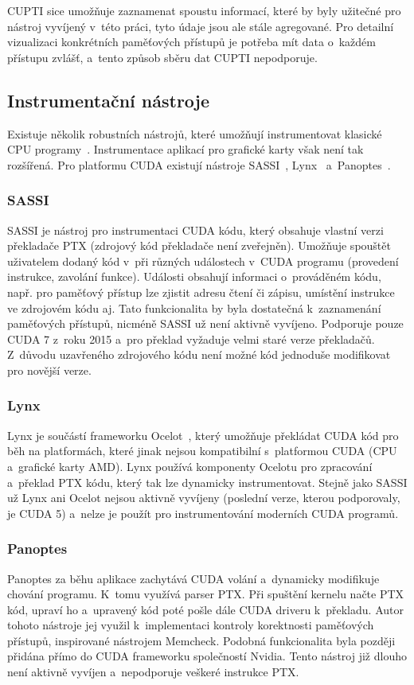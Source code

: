 CUPTI sice umožňuje zaznamenat spoustu informací, které by byly užitečné pro nástroj vyvíjený v~této práci, tyto údaje jsou ale stále agregované. Pro detailní vizualizaci konkrétních paměťových přístupů je potřeba mít data o~každém přístupu zvlášť, a~tento způsob sběru dat CUPTI nepodporuje.

\subsection{Instrumentační nástroje}
Existuje několik robustních nástrojů, které umožňují instrumentovat klasické CPU programy~\cite{valgrind, pin, dynamorio}. Instrumentace aplikací pro grafické karty však není tak rozšířená. Pro platformu CUDA existují nástroje SASSI~\cite{sassi}, Lynx~\cite{lynx} a~Panoptes~\cite{panoptes}.

\subsubsection*{SASSI}
SASSI je nástroj pro instrumentaci CUDA kódu, který obsahuje vlastní verzi překladače PTX (zdrojový kód překladače není zveřejněn). Umožňuje spouštět uživatelem dodaný kód v~\CPP\hspace{1mm}při různých událostech v~CUDA programu (provedení instrukce, zavolání funkce). Události obsahují informaci o~prováděném kódu, např. pro paměťový přístup lze zjistit adresu čtení či zápisu, umístění instrukce ve zdrojovém kódu aj. Tato funkcionalita by byla dostatečná k~zaznamenání paměťových přístupů, nicméně SASSI už není aktivně vyvíjeno. Podporuje pouze CUDA 7 z~roku 2015 a~pro překlad vyžaduje velmi staré verze překladačů. Z~důvodu uzavřeného zdrojového kódu není možné kód jednoduše modifikovat pro novější verze.

\subsubsection*{Lynx}
Lynx je součástí frameworku Ocelot~\cite{ocelot}, který umožňuje překládat CUDA kód pro běh na platformách, které jinak nejsou kompatibilní s~platformou CUDA (CPU a~grafické karty AMD). Lynx používá komponenty Ocelotu pro zpracování a~překlad PTX kódu, který tak lze dyna\-micky instrumentovat. Stejně jako SASSI už Lynx ani Ocelot nejsou aktivně vyvíjeny (poslední verze, kterou podporovaly, je CUDA 5) a~nelze je použít pro instrumentování moderních CUDA programů.

\subsubsection*{Panoptes}
Panoptes za běhu aplikace zachytává CUDA volání a~dynamicky modifikuje chování programu. K~tomu využívá parser PTX. Při spuštění kernelu načte PTX kód, upraví ho a~upravený kód poté pošle dále CUDA driveru k~překladu. Autor tohoto nástroje jej využil k~implementaci kontroly korektnosti paměťových přístupů, inspirované nástrojem Memcheck. Podobná funkcionalita byla později přidána přímo do CUDA frameworku společností Nvidia. Tento nástroj již dlouho není aktivně vyvíjen a~nepodporuje veškeré instrukce PTX.

